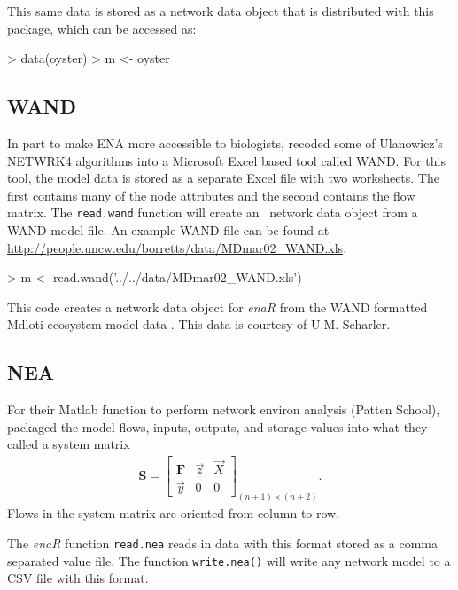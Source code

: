\documentclass[article]{jss}
\newcommand{\R}{\proglang{R}}
\begin{document}
This same data is stored as a network data object that is distributed
with this package, which can be accessed as:
\begin{Schunk}
\begin{Sinput}
> data(oyster)
> m <- oyster
\end{Sinput}
\end{Schunk}

\subsection*{WAND}
In part to make ENA more accessible to biologists,
\citet{allesina04_wand} recoded some of Ulanowicz's NETWRK4 algorithms
into a Microsoft Excel based tool called WAND.  For this tool, the
model data is stored as a separate Excel file with two worksheets.
The first contains many of the node attributes and the second contains the
flow matrix.  The \texttt{read.wand} function will create an \R\
network data object from a WAND model file. An example WAND file can
be found at \url{http://people.uncw.edu/borretts/data/MDmar02_WAND.xls}.

\begin{Schunk}
\begin{Sinput}
> m <- read.wand('../../data/MDmar02_WAND.xls')
\end{Sinput}
\end{Schunk}

This code creates a network data object for \textit{enaR} from the WAND
formatted Mdloti ecosystem model data
\citep{scharler2012ecosystem}. This data is courtesy of U.M. Scharler.

\subsection*{NEA}

For their Matlab function to perform network environ analysis (Patten School),
\citet{fath06} packaged the model flows, inputs, outputs, and storage
values into what they called a system matrix
\begin{align}
\mathbf{S} = \left[ \begin{array}{ccc} \mathbf{F} & \vec{z} & \vec{X} \\
     \vec{y}  &  0 & 0 \end{array}
\right]_{(n+1) \times (n+2)}.
\end{align}
Flows in the system matrix are oriented from column to row.

The \textit{enaR} function \texttt{read.nea} reads in data with this
format stored as a comma separated value file.  The function
\texttt{write.nea()} will write any network model to a CSV file with
this format.
\end{document}
